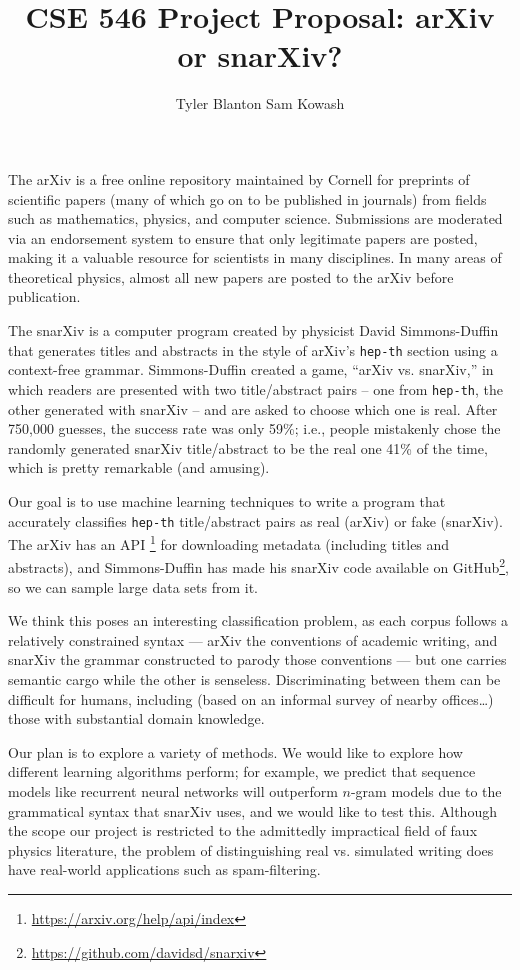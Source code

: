 \documentclass[11pt,letterpaper]{article}
\author{Tyler Blanton \quad Sam Kowash}
\title{CSE 546 Project Proposal: arXiv or snarXiv?}
\numberwithin{equation}{section}
\numberwithin{figure}{section}
\begin{document}
\maketitle
The arXiv is a free online repository maintained by Cornell for preprints of scientific papers (many of which go on to be published in journals) from fields such as mathematics, physics, and computer science.
Submissions are moderated via an endorsement system to ensure that only legitimate papers are posted, making it a valuable resource for scientists in many disciplines. In many areas of theoretical physics, almost all new papers are posted to the arXiv before publication.

The snarXiv is a computer program created by physicist David Simmons-Duffin that generates titles and abstracts in the style of arXiv's \texttt{hep-th} section using a context-free grammar.
Simmons-Duffin created a game, ``arXiv vs. snarXiv,'' in which readers are presented with two title/abstract pairs -- one from \texttt{hep-th}, the other generated with snarXiv -- and are asked to choose which one is real.
After 750,000 guesses, the success rate was only 59\%; i.e., people mistakenly chose the randomly generated snarXiv title/abstract to be the real one 41\% of the time, which is pretty remarkable (and amusing).

Our goal is to use machine learning techniques to write a program that accurately classifies \texttt{hep-th} title/abstract pairs as real (arXiv) or fake (snarXiv).
The arXiv has an API%
\footnote{\url{https://arxiv.org/help/api/index}}
for downloading metadata (including titles and abstracts), and Simmons-Duffin has made his snarXiv code available on GitHub\footnote{\url{https://github.com/davidsd/snarxiv}}, so we can sample large data sets from it.
%

We think this poses an interesting classification problem, as each corpus follows a relatively constrained syntax --- arXiv the conventions of academic writing, and snarXiv the grammar constructed to parody those conventions --- but one carries semantic cargo while the other is senseless. Discriminating between them can be difficult for humans, including (based on an informal survey of nearby offices\ldots) those with substantial domain knowledge.

Our plan is to explore a variety of methods.
We would like to explore how different learning algorithms perform; for example, we predict that sequence models like recurrent neural networks will outperform $n$-gram models due to the grammatical syntax that snarXiv uses, and we would like to test this.
Although the scope our project is restricted to the admittedly impractical field of faux physics literature, the problem of distinguishing real vs. simulated writing does have real-world applications such as spam-filtering. 
\end{document}
